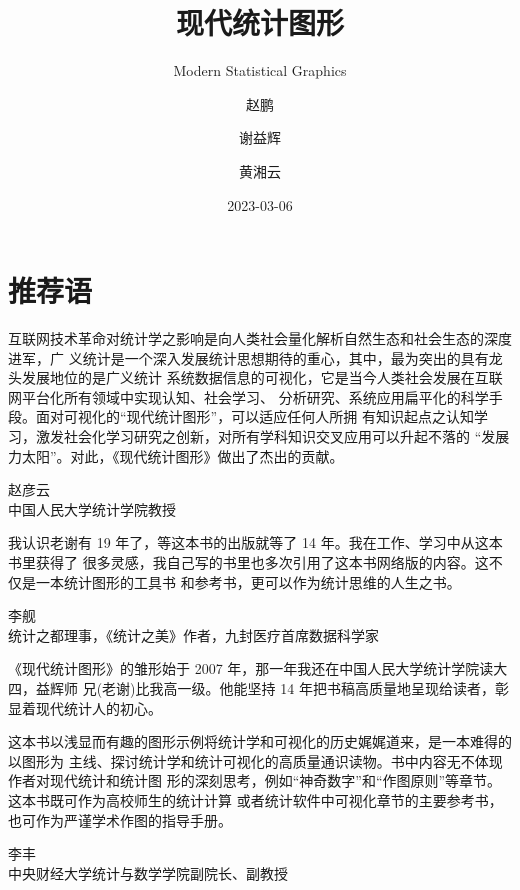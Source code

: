 \documentclass[
  b5paper,
  UTF8,twoside]{book}
\title{现代统计图形}
\subtitle{Modern Statistical Graphics}
\author{赵鹏 \and 谢益辉 \and 黄湘云}
\date{2023-03-06}
\begin{document}
\maketitle

{
\hypersetup{linkcolor=}
\setcounter{tocdepth}{1}
\tableofcontents
}
\listoffigures
\listoftables
\hypertarget{welcome}{%
\chapter*{推荐语}\label{welcome}}

互联网技术革命对统计学之影响是向人类社会量化解析自然生态和社会生态的深度进军，广 义统计是一个深入发展统计思想期待的重心，其中，最为突出的具有龙头发展地位的是广义统计 系统数据信息的可视化，它是当今人类社会发展在互联网平台化所有领域中实现认知、社会学习、 分析研究、系统应用扁平化的科学手段。面对可视化的``现代统计图形''，可以适应任何人所拥 有知识起点之认知学习，激发社会化学习研究之创新，对所有学科知识交叉应用可以升起不落的
``发展力太阳''。对此，《现代统计图形》做出了杰出的贡献。

\begin{flushright}
赵彦云\\
中国人民大学统计学院教授
\end{flushright}

我认识老谢有 19 年了，等这本书的出版就等了 14 年。我在工作、学习中从这本书里获得了 很多灵感，我自己写的书里也多次引用了这本书网络版的内容。这不仅是一本统计图形的工具书 和参考书，更可以作为统计思维的人生之书。

\begin{flushright}
李舰\\
统计之都理事，《统计之美》作者，九封医疗首席数据科学家
\end{flushright}

《现代统计图形》的雏形始于 2007 年，那一年我还在中国人民大学统计学院读大四，益辉师
兄(老谢)比我高一级。他能坚持 14 年把书稿高质量地呈现给读者，彰显着现代统计人的初心。

这本书以浅显而有趣的图形示例将统计学和可视化的历史娓娓道来，是一本难得的以图形为 主线、探讨统计学和统计可视化的高质量通识读物。书中内容无不体现作者对现代统计和统计图 形的深刻思考，例如``神奇数字''和``作图原则''等章节。这本书既可作为高校师生的统计计算 或者统计软件中可视化章节的主要参考书，也可作为严谨学术作图的指导手册。

\begin{flushright}
李丰\\
中央财经大学统计与数学学院副院长、副教授
\end{flushright}
\end{document}
